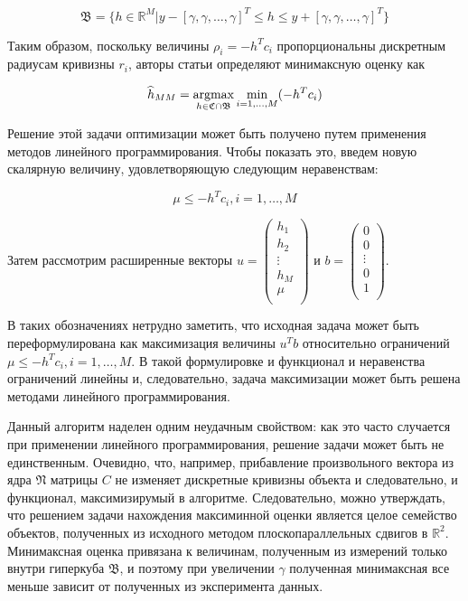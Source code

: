 \documentclass[a4paper, 12pt, titlepage]{article}
\theoremstyle{definition}
\theoremstyle{plain}
\begin{document}
\begin{equation}
\mathfrak{B} = \{h \in \mathbb{R}^{M} |
y - [\gamma, \gamma, \ldots, \gamma]^{T} \leq h \leq
y + [\gamma, \gamma, \ldots, \gamma]^{T}\}
\end{equation}

Таким образом, поскольку величины $\rho_{i} = - h^{T} c_{i}$ пропорциональны
дискретным радиусам кривизны $r_{i}$, авторы статьи определяют минимаксную
оценку как

\begin{equation}
\widehat{h}_{MM} =
\operatornamewithlimits{argmax}_{h \in \mathfrak{C} \cap \mathfrak{B}}
\min_{i = 1, \ldots, M} ( - h^{T} c_{i})
\end{equation}

Решение этой задачи оптимизации может быть получено путем применения методов
линейного программирования. Чтобы показать это, введем новую скалярную величину,
удовлетворяющую следующим неравенствам:

\begin{equation}
\mu \leq - h^{T} c_{i}, i = 1, \ldots, M
\end{equation}

Затем рассмотрим расширенные векторы
$u = \left(
\begin{array}{c}
 h_{1} \\
 h_{2} \\
 \vdots \\
 h_{M} \\
 \mu \\
\end{array}
\right)$ и
$ b = \left(\begin{array}{c}
 0 \\
 0 \\
 \vdots \\
 0 \\
 1 \\
\end{array}
\right)$.

В таких обозначениях нетрудно заметить, что исходная задача может
быть переформулирована как максимизация величины $u^{T} b$ относительно
ограничений $\mu \leq - h^{T} c_{i}, i = 1, \ldots, M$. В такой формулировке и
функционал и неравенства ограничений линейны и, следовательно, задача
максимизации может быть решена методами линейного программирования.

Данный алгоритм наделен одним неудачным свойством: как это часто случается при
применении линейного программирования, решение задачи может быть не
единственным. Очевидно, что, например, прибавление произвольного вектора из ядра
$\mathfrak{N}$ матрицы $C$ не изменяет дискретные кривизны объекта и
следовательно, и функционал, максимизирумый в алгоритме. Следовательно, можно
утверждать, что решением задачи нахождения максиминной оценки является целое
семейство объектов, полученных из исходного методом плоскопараллельных сдвигов в
$\mathbb{R}^{2}$. Минимаксная оценка привязана к величинам, полученным из
измерений только внутри гиперкуба $\mathfrak{B}$, и поэтому при увеличении
$\gamma$ полученная минимаксная все меньше зависит от полученных из эксперимента
данных.
\end{document}
